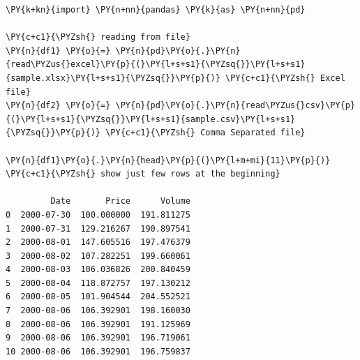 \begin{tcolorbox}[breakable, size=fbox, boxrule=1pt, pad at break*=1mm,colback=cellbackground, colframe=cellborder]
\begin{Verbatim}[commandchars=\\\{\}]
\PY{k+kn}{import} \PY{n+nn}{pandas} \PY{k}{as} \PY{n+nn}{pd}

\PY{c+c1}{\PYZsh{} reading from file}
\PY{n}{df1} \PY{o}{=} \PY{n}{pd}\PY{o}{.}\PY{n}{read\PYZus{}excel}\PY{p}{(}\PY{l+s+s1}{\PYZsq{}}\PY{l+s+s1}{sample.xlsx}\PY{l+s+s1}{\PYZsq{}}\PY{p}{)} \PY{c+c1}{\PYZsh{} Excel file}
\PY{n}{df2} \PY{o}{=} \PY{n}{pd}\PY{o}{.}\PY{n}{read\PYZus{}csv}\PY{p}{(}\PY{l+s+s1}{\PYZsq{}}\PY{l+s+s1}{sample.csv}\PY{l+s+s1}{\PYZsq{}}\PY{p}{)} \PY{c+c1}{\PYZsh{} Comma Separated file}

\PY{n}{df1}\PY{o}{.}\PY{n}{head}\PY{p}{(}\PY{l+m+mi}{11}\PY{p}{)} \PY{c+c1}{\PYZsh{} show just few rows at the beginning}

         Date       Price      Volume
0  2000-07-30  100.000000  191.811275
1  2000-07-31  129.216267  190.897541
2  2000-08-01  147.605516  197.476379
3  2000-08-02  107.282251  199.660061
4  2000-08-03  106.036826  200.840459
5  2000-08-04  118.872757  197.130212
6  2000-08-05  101.904544  204.552521
7  2000-08-06  106.392901  198.160030
8  2000-08-06  106.392901  191.125969
9  2000-08-06  106.392901  196.719061
10 2000-08-06  106.392901  196.759837
\end{Verbatim}
\end{tcolorbox}

